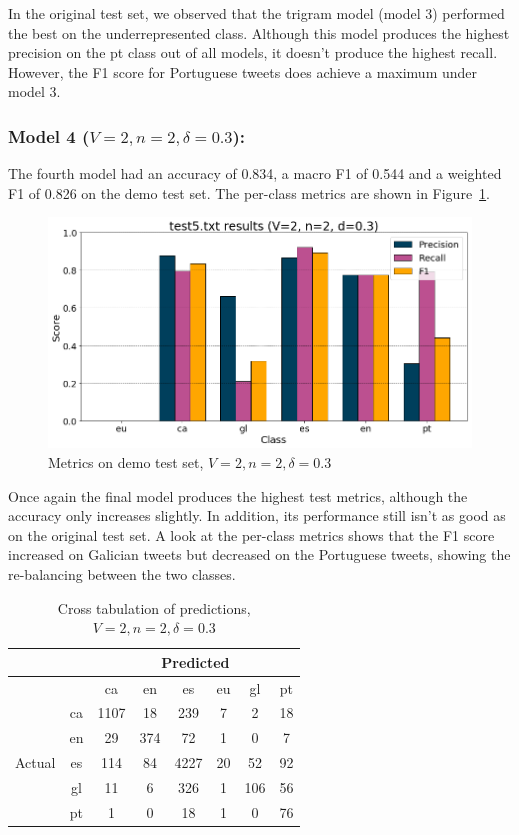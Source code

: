 \documentclass[runningheads]{llncs}
\begin{document}
In the original test set, we observed that the trigram model (model 3) performed the best on the underrepresented class. Although this model produces the highest precision on the pt class out of all models, it doesn't produce the highest recall. However, the F1 score for Portuguese tweets does achieve a maximum under model 3.

\subsubsection{Model 4 ($V=2, n=2, \delta=0.3$): }
The fourth model had an accuracy of 0.834, a macro F1 of 0.544 and a weighted F1 of 0.826 on the demo test set. The per-class metrics are shown in Figure~\ref{fig:demo_2_2_0.3}.

\begin{figure}
    \begin{center}
        \includegraphics[width=12.5cm]{images/test5_results_2_2_0-3.png}
        \caption{Metrics on demo test set, $V=2, n=2, \delta=0.3$}
        \label{fig:demo_2_2_0.3}
    \end{center}
\end{figure}

Once again the final model produces the highest test metrics, although the accuracy only increases slightly. In addition, its performance still isn't as good as on the original test set. A look at the per-class metrics shows that the F1 score increased on Galician tweets but decreased on the Portuguese tweets, showing the re-balancing between the two classes.

\begin{table}
	\centering
	\caption{Cross tabulation of predictions, $V=2, n=2, \delta=0.3$}
	\label{tab:demo_confusion_2_2_0.3}
	\begin{tabular}{|c|c|c|c|c|c|c|c|} \hline
	    & & \multicolumn{6}{c|}{Predicted} \\ \hline
		& &    ca &   en &    es &  eu &   gl &  pt \\ \hline
		\multirow{6}{*}{Actual} & ca   &  1107 &   18 &   239 &   7 &    2 &  18 \\
		& en   &    29 &  374 &    72 &   1 &    0 &   7 \\
		& es   &   114 &   84 &  4227 &  20 &   52 &  92 \\
		& gl   &    11 &    6 &   326 &   1 &  106 &  56 \\
		& pt   &     1 &    0 &    18 &   1 &    0 &  76 \\ \hline
	\end{tabular}
\end{table}
\end{document}
